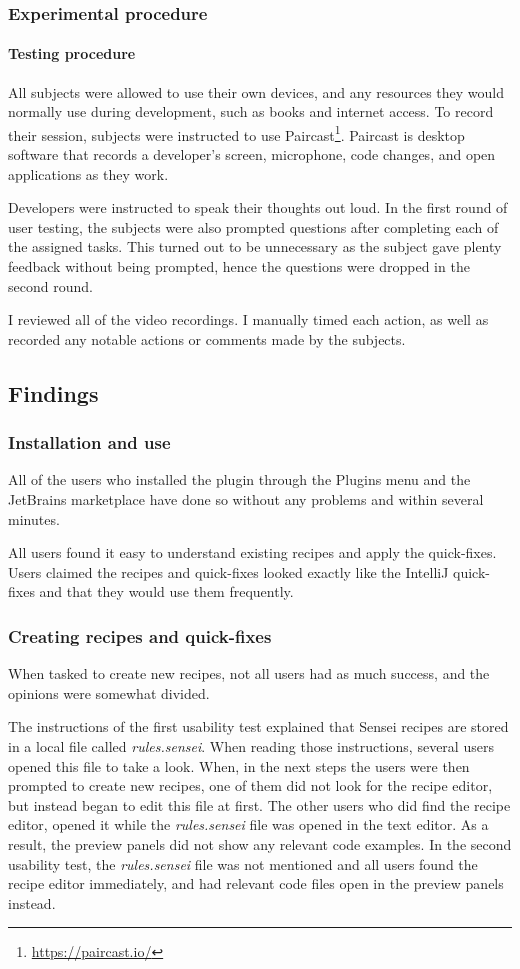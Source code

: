 \subsubsection{Experimental procedure}
\paragraph{Testing procedure}
All subjects were allowed to use their own devices, and any resources they would normally use during development, such as books and internet access. To record their session, subjects were instructed to use Paircast\footnote{\url{https://paircast.io/}}.
Paircast is desktop software that records a developer's screen, microphone, code changes, and open applications as they work.

Developers were instructed to speak their thoughts out loud.
In the first round of user testing, the subjects were also prompted questions after completing each of the assigned tasks.
This turned out to be unnecessary as the subject gave plenty feedback without being prompted, hence the questions were dropped in the second round.

I reviewed all of the video recordings.
I manually timed each action, as well as recorded any notable actions or comments made by the subjects.

\subsection{Findings}
\subsubsection{Installation and use}
All of the users who installed the plugin through the Plugins menu and the JetBrains marketplace have done so without any problems and within several minutes.

All users found it easy to understand existing recipes and apply the quick-fixes.
Users claimed the recipes and quick-fixes looked exactly like the IntelliJ quick-fixes and that they would use them frequently.

\subsubsection{Creating recipes and quick-fixes}
When tasked to create new recipes, not all users had as much success, and the opinions were somewhat divided.

The instructions of the first usability test explained that Sensei recipes are stored in a local file called \textit{rules.sensei}.
When reading those instructions, several users opened this file to take a look.
When, in the next steps the users were then prompted to create new recipes, one of them did not look for the recipe editor, but instead began to edit this file at first.
The other users who did find the recipe editor, opened it while the \textit{rules.sensei} file was opened in the text editor.
As a result, the preview panels did not show any relevant code examples.
In the second usability test, the \textit{rules.sensei} file was not mentioned and all users found the recipe editor immediately, and had relevant code files open in the preview panels instead.


